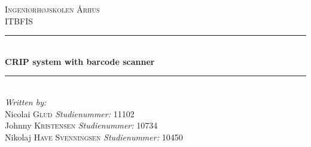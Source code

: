 \newcommand{\HRule}{\rule{\linewidth}{0.5mm}} %

\begin{center} %
 

\textsc{\LARGE Ingeniørhøjskolen Århus}\\[1.5cm] %
\textsc{\large ITBFIS}\\[0.5cm] %


\HRule \\[0.4cm]
{ \huge \bfseries CRIP system with barcode scanner}\\[0.4cm] %
\HRule \\[1.5cm]
 

\Large \emph{Written by:}\\
Nicolai \textsc{Glud} \textit{Studienummer:} 11102\\
Johnny \textsc{Kristensen} \textit{Studienummer:} 10734\\
Nikolaj \textsc{Have Svenningsen} \textit{Studienummer:} 10450\\



\end{center}

